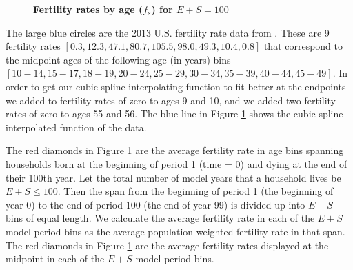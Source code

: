   \begin{figure}[htbp]\centering \captionsetup{width=4.0in}
    \caption{\label{FigFertRates}\textbf{Fertility rates by age ($f_s$) for $E+S=100$}}
  \end{figure}

  The large blue circles are the 2013 U.S. fertility rate data from \citet{MartinEtAl:2015}. These are 9 fertility rates $[0.3, 12.3, 47.1, 80.7, 105.5, 98.0, 49.3, 10.4, 0.8]$ that correspond to the midpoint ages of the following age (in years) bins $[10-14, 15-17, 18-19, 20-24, 25-29, 30-34, 35-39, 40-44, 45-49]$. In order to get our cubic spline interpolating function to fit better at the endpoints we added to fertility rates of zero to ages 9 and 10, and we added two fertility rates of zero to ages 55 and 56. The blue line in Figure \ref{FigFertRates} shows the cubic spline interpolated function of the data.

  The red diamonds in Figure \ref{FigFertRates} are the average fertility rate in age bins spanning households born at the beginning of period 1 (time = 0) and dying at the end of their 100th year. Let the total number of model years that a household lives be $E+S\leq 100$. Then the span from the beginning of period 1 (the beginning of year 0) to the end of period 100 (the end of year 99) is divided up into $E+S$ bins of equal length. We calculate the average fertility rate in each of the $E+S$ model-period bins as the average population-weighted fertility rate in that span. The red diamonds in Figure \ref{FigFertRates} are the average fertility rates displayed at the midpoint in each of the $E+S$ model-period bins.


